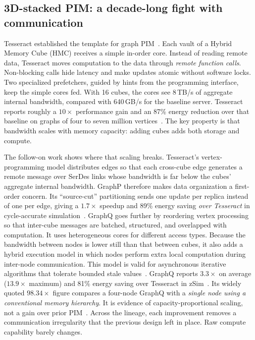 \documentclass[journal,onecolumn]{IEEEtran}
\begin{document}
\subsection{3D-stacked PIM: a decade-long fight with communication}
Tesseract established the template for graph PIM~\cite{ahn2015tesseract}. Each vault of a Hybrid Memory Cube (HMC) receives a simple in-order core. Instead of reading remote data, Tesseract moves computation to the data through \emph{remote function calls}. Non-blocking calls hide latency and make updates atomic without software locks. Two specialized prefetchers, guided by hints from the programming interface, keep the simple cores fed. With 16 cubes, the cores see 8\,TB/s of aggregate internal bandwidth, compared with 640\,GB/s for the baseline server. Tesseract reports roughly a $10\times$ performance gain and an 87\% energy reduction over that baseline on graphs of four to seven million vertices~\cite{ahn2015tesseract}. The key property is that bandwidth scales with memory capacity: adding cubes adds both storage and compute.

The follow-on work shows where that scaling breaks. Tesseract's vertex-programming model distributes edges so that each cross-cube edge generates a remote message over SerDes links whose bandwidth is far below the cubes' aggregate internal bandwidth. GraphP therefore makes data organization a first-order concern. Its ``source-cut'' partitioning sends one update per replica instead of one per edge, giving a $1.7\times$ speedup and 89\% energy saving \emph{over Tesseract} in cycle-accurate simulation~\cite{zhang2018graphp}. GraphQ goes further by reordering vertex processing so that inter-cube messages are batched, structured, and overlapped with computation. It uses heterogeneous cores for different access types. Because the bandwidth between nodes is lower still than that between cubes, it also adds a hybrid execution model in which nodes perform extra local computation during inter-node communication. This model is valid for asynchronous iterative algorithms that tolerate bounded stale values~\cite{zhuo2019graphq}. GraphQ reports $3.3\times$ on average ($13.9\times$ maximum) and 81\% energy saving over Tesseract in zSim~\cite{zhuo2019graphq}. Its widely quoted $98.34\times$ figure compares a four-node GraphQ with a \emph{single node using a conventional memory hierarchy}. It is evidence of capacity-proportional scaling, not a gain over prior PIM~\cite{zhuo2019graphq}. Across the lineage, each improvement removes a communication irregularity that the previous design left in place. Raw compute capability barely changes.
\end{document}
